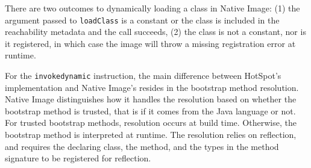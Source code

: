 There are two outcomes to dynamically loading a class in Native Image: (1) the argument passed to \verb|loadClass| is a constant or the class is included in the reachability metadata and the call succeeds, (2) the class is not a constant, nor is it registered, in which case the image will throw a missing registration error at runtime.

For the \verb|invokedynamic| instruction, the main difference between HotSpot's implementation and Native Image's resides in the bootstrap method resolution. Native Image distinguishes how it handles the resolution based on whether the bootstrap method is trusted, that is if it comes from the Java language or not. For trusted bootstrap methods, resolution occurs at build time. Otherwise, the bootstrap method is interpreted at runtime. The resolution relies on reflection, and requires the declaring class, the method, and the types in the method signature to be registered for reflection.